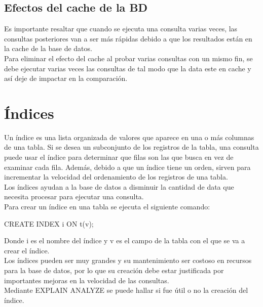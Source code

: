 \subsection{Efectos del cache de la BD}

Es importante resaltar que cuando se ejecuta una consulta varias veces, las consultas posteriores van a ser más rápidas debido a que los resultados están en la cache de la base de datos.\\

Para eliminar el efecto del cache al probar varias consultas con un mismo fin, se debe ejecutar varias veces las consultas de tal modo que la data este en cache y así deje de impactar en la comparación.

\section{Índices}

Un índice es una lista organizada de valores que aparece en una o más columnas de una tabla. Si se desea un subconjunto de los registros de la tabla, una consulta puede usar el índice para determinar que filas son las que busca en vez de examinar cada fila. Además, debido a que un índice tiene un orden, sirven para incrementar la velocidad del ordenamiento de los registros de una tabla.\\

Los índices ayudan a la base de datos a disminuir la cantidad de data que necesita procesar para ejecutar una consulta.\\

Para crear un índice en una tabla se ejecuta el siguiente comando:\\

\begin{pyglist}
CREATE INDEX i ON t(v);
\end{pyglist}

Donde i es el nombre del índice y v es el campo de la tabla con el que se va a crear el índice.\\

Los índices pueden ser muy grandes y su mantenimiento ser costoso en recursos para la base de datos, por lo que su creación debe estar justificada por importantes mejoras en la velocidad de las consultas.\\

Mediante EXPLAIN ANALYZE se puede hallar si fue útil o no la creación del índice.\\

